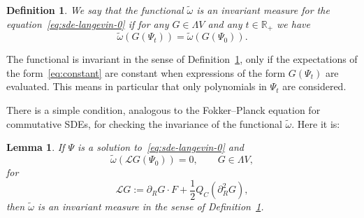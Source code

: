 \documentclass{article}
\newcommand{\assign}{:=}
\newtheorem{definition}[theorem]{Definition}
\newtheorem{lemma}[theorem]{Lemma}
\begin{document}
\begin{definition}
  \label{definition_invariant}We say that the functional $\tilde{\omega}$ is
  an invariant measure for the equation~{\eqref{eq:sde-langevin-0}} if for any
  $G \in \Lambda V$ and any $t \in \mathbb{R}_+$ we have
  \begin{equation}
    \tilde{\omega} (G (\Psi_t)) = \tilde{\omega} (G (\Psi_0)) .
    \label{eq:constant}
  \end{equation}
\end{definition}

\begin{remark}
  The functional is invariant in the sense of
  Definition~\ref{definition_invariant}, only if the expectations of the
  form~{\eqref{eq:constant}} are constant when expressions of the form $G
  (\Psi_t)$ are evaluated. This means in particular that only polynomials in
  $\Psi_t$ are considered.
\end{remark}

There is a simple condition, analogous to the Fokker--Planck equation for
commutative SDEs, for checking the invariance of the functional
$\tilde{\omega}$. Here it is:

\begin{lemma}
  \label{lemma_invariant}If $\Psi$ is a solution
  to~{\eqref{eq:sde-langevin-0}} and
  \begin{equation}
    \tilde{\omega} (\mathcal{L}G (\Psi_0)) = 0, \qquad G \in \Lambda V
    \label{eq:inf-invariance},
  \end{equation}
  for
  \[ \mathcal{L}G \assign \partial_R G \cdot F + \frac{1}{2} Q_C (\partial_R^2
     G), \]
  then $\tilde{\omega}$ is an invariant measure in the sense of
  Definition~\ref{definition_invariant}.
\end{lemma}
\end{document}
